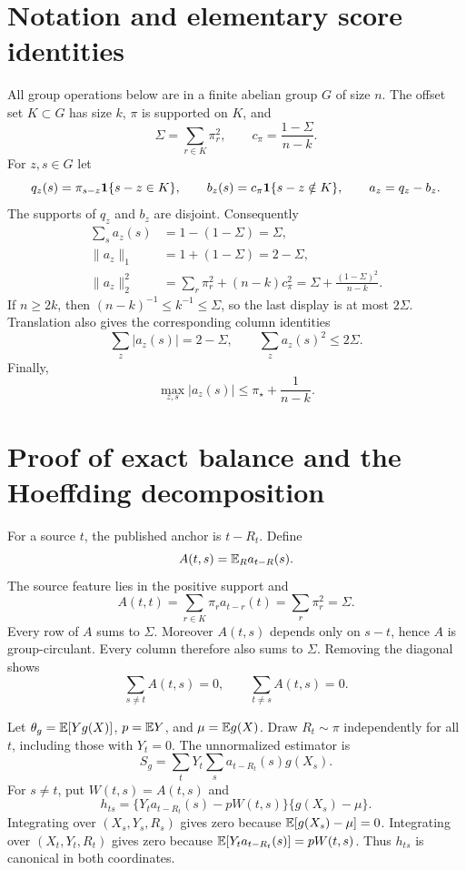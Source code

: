 \section{Notation and elementary score identities}

All group operations below are in a finite abelian group $G$ of size $n$. The offset set $K\subset G$ has size $k$, $\pi$ is supported on $K$, and
\[
 \Sigma=\sum_{r\in K}\pi_r^2,\qquad
 c_\pi=\frac{1-\Sigma}{n-k}.
\]
For $z,s\in G$ let
\[
 q_z(s)=\pi_{s-z}\mathbf 1\{s-z\in K\},\qquad
 b_z(s)=c_\pi\mathbf 1\{s-z\notin K\},\qquad a_z=q_z-b_z.
\]
The supports of $q_z$ and $b_z$ are disjoint. Consequently
\begin{align*}
 \sum_sa_z(s)&=1-(1-\Sigma)=\Sigma,\\
 \|a_z\|_1&=1+(1-\Sigma)=2-\Sigma,\\
 \|a_z\|_2^2&=\sum_r\pi_r^2+(n-k)c_\pi^2
 =\Sigma+\frac{(1-\Sigma)^2}{n-k}.
\end{align*}
If $n\ge2k$, then $(n-k)^{-1}\le k^{-1}\le\Sigma$, so the last display is at most $2\Sigma$. Translation also gives the corresponding column identities
\begin{equation}
 \sum_z|a_z(s)|=2-\Sigma,\qquad
 \sum_z a_z(s)^2\le2\Sigma.
 \label{app:eq:columnenergy}
\end{equation}
Finally,
\begin{equation}
 \max_{z,s}|a_z(s)|\le \pi_\star+\frac1{n-k}.
 \label{app:eq:supscore}
\end{equation}

\section{Proof of exact balance and the Hoeffding decomposition}

For a source $t$, the published anchor is $t-R_t$. Define
\[
 A(t,s)=\mathbb E_R a_{t-R}(s).
\]
The source feature lies in the positive support and
\[
 A(t,t)=\sum_{r\in K}\pi_r a_{t-r}(t)=\sum_r\pi_r^2=\Sigma.
\]
Every row of $A$ sums to $\Sigma$. Moreover $A(t,s)$ depends only on $s-t$, hence $A$ is group-circulant. Every column therefore also sums to $\Sigma$. Removing the diagonal shows
\begin{equation}
 \sum_{s\ne t}A(t,s)=0,\qquad
 \sum_{t\ne s}A(t,s)=0.
 \label{app:eq:doublebalance}
\end{equation}

Let $\theta_g=\mathbb E[Yg(X)]$, $p=\mathbb E Y$, and $\mu=\mathbb E g(X)$. Draw $R_t\sim\pi$ independently for all $t$, including those with $Y_t=0$. The unnormalized estimator is
\[
 S_g=\sum_tY_t\sum_sa_{t-R_t}(s)g(X_s).
\]
For $s\ne t$, put $W(t,s)=A(t,s)$ and
\[
 h_{ts}=\{Y_ta_{t-R_t}(s)-pW(t,s)\}\{g(X_s)-\mu\}.
\]
Integrating over $(X_s,Y_s,R_s)$ gives zero because $\mathbb E[g(X_s)-\mu]=0$. Integrating over $(X_t,Y_t,R_t)$ gives zero because $\mathbb E[Y_ta_{t-R_t}(s)]=pW(t,s)$. Thus $h_{ts}$ is canonical in both coordinates.

